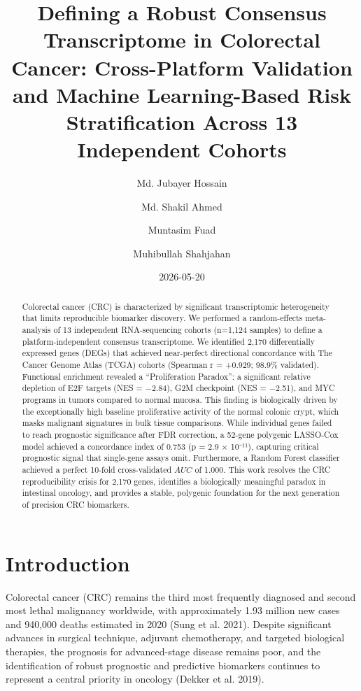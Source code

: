 \documentclass[
  12pt,
]{article}
\title{Defining a Robust Consensus Transcriptome in Colorectal Cancer:
Cross-Platform Validation and Machine Learning-Based Risk Stratification
Across 13 Independent Cohorts}
\author{Md. Jubayer Hossain \and Md. Shakil Ahmed \and Muntasim
Fuad \and Muhibullah Shahjahan}
\date{2026-05-20}
\begin{document}
\maketitle
\begin{abstract}
Colorectal cancer (CRC) is characterized by significant transcriptomic
heterogeneity that limits reproducible biomarker discovery. We performed
a random-effects meta-analysis of 13 independent RNA-sequencing cohorts
(n=1,124 samples) to define a platform-independent consensus
transcriptome. We identified 2,170 differentially expressed genes (DEGs)
that achieved near-perfect directional concordance with The Cancer
Genome Atlas (TCGA) cohorts (Spearman r = +0.929; 98.9\% validated).
Functional enrichment revealed a ``Proliferation Paradox'': a
significant relative depletion of E2F targets (NES = −2.84), G2M
checkpoint (NES = −2.51), and MYC programs in tumors compared to normal
mucosa. This finding is biologically driven by the exceptionally high
baseline proliferative activity of the normal colonic crypt, which masks
malignant signatures in bulk tissue comparisons. While individual genes
failed to reach prognostic significance after FDR correction, a 52-gene
polygenic LASSO-Cox model achieved a concordance index of 0.753 (p = 2.9
× 10⁻¹¹), capturing critical prognostic signal that single-gene assays
omit. Furthermore, a Random Forest classifier achieved a perfect 10-fold
cross-validated \(AUC\) of 1.000. This work resolves the CRC
reproducibility crisis for 2,170 genes, identifies a biologically
meaningful paradox in intestinal oncology, and provides a stable,
polygenic foundation for the next generation of precision CRC
biomarkers.
\end{abstract}


\section{Introduction}\label{introduction}

Colorectal cancer (CRC) remains the third most frequently diagnosed and
second most lethal malignancy worldwide, with approximately 1.93 million
new cases and 940,000 deaths estimated in 2020 (Sung et al. 2021).
Despite significant advances in surgical technique, adjuvant
chemotherapy, and targeted biological therapies, the prognosis for
advanced-stage disease remains poor, and the identification of robust
prognostic and predictive biomarkers continues to represent a central
priority in oncology (Dekker et al. 2019).
\end{document}
